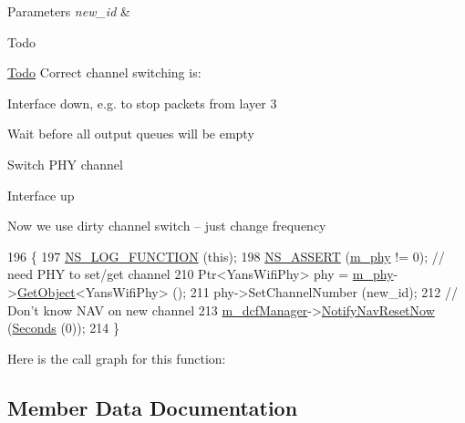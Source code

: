 \begin{DoxyParams}{Parameters}
{\em new\+\_\+id} & \\
\hline
\end{DoxyParams}
\begin{DoxyRefDesc}{Todo}
\item[\hyperlink{todo__todo000129}{Todo}]Correct channel switching is\+:\end{DoxyRefDesc}



\begin{DoxyEnumerate}
\item Interface down, e.\+g. to stop packets from layer 3
\item Wait before all output queues will be empty
\item Switch P\+HY channel
\item Interface up
\end{DoxyEnumerate}

Now we use dirty channel switch -- just change frequency
\begin{DoxyCode}
196 \{
197   \hyperlink{log-macros-disabled_8h_a90b90d5bad1f39cb1b64923ea94c0761}{NS\_LOG\_FUNCTION} (\textcolor{keyword}{this});
198   \hyperlink{assert_8h_a6dccdb0de9b252f60088ce281c49d052}{NS\_ASSERT} (\hyperlink{classns3_1_1RegularWifiMac_a1a6dad8eb0a057a4e1b459f518457a4c}{m\_phy} != 0); \textcolor{comment}{// need PHY to set/get channel}
210 \textcolor{comment}{}  Ptr<YansWifiPhy> phy = \hyperlink{classns3_1_1RegularWifiMac_a1a6dad8eb0a057a4e1b459f518457a4c}{m\_phy}->\hyperlink{classns3_1_1Object_a13e18c00017096c8381eb651d5bd0783}{GetObject}<YansWifiPhy> ();
211   phy->SetChannelNumber (new\_id);
212   \textcolor{comment}{// Don't know NAV on new channel}
213   \hyperlink{classns3_1_1RegularWifiMac_affcfccaae7c9ff15df0ad6752df95a16}{m\_dcfManager}->\hyperlink{classns3_1_1DcfManager_ac0d2e9acdfa5c64eb21c4a298f22072e}{NotifyNavResetNow} (\hyperlink{group__timecivil_ga33c34b816f8ff6628e33d5c8e9713b9e}{Seconds} (0));
214 \}
\end{DoxyCode}


Here is the call graph for this function\+:




\subsection{Member Data Documentation}
